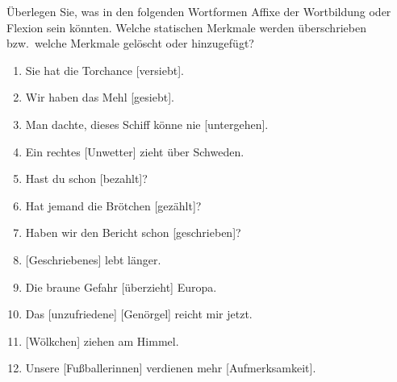 \Uebung[\twostar] \label{u63} Überlegen Sie, was in den folgenden Wortformen Affixe der Wortbildung oder Flexion sein könnten.
Welche statischen Merkmale werden überschrieben bzw.\ welche Merkmale gelöscht oder hinzugefügt?

\begin{enumerate}\Lf
  \item Sie hat die Torchance {[versiebt]}.
  \item Wir haben das Mehl {[gesiebt]}.
  \item Man dachte, dieses Schiff könne nie {[untergehen]}.
  \item Ein rechtes {[Unwetter]} zieht über Schweden.
  \item Hast du schon {[bezahlt]}?
  \item Hat jemand die Brötchen {[gezählt]}?
  \item Haben wir den Bericht schon {[geschrieben]}?
  \item {[Geschriebenes]} lebt länger.
  \item Die braune Gefahr {[überzieht]} Europa.
  \item Das {[unzufriedene]} {[Genörgel]} reicht mir jetzt.
  \item {[Wölkchen]} ziehen am Himmel.
  \item Unsere {[Fußballerinnen]} verdienen mehr {[Aufmerksamkeit]}.
\end{enumerate}

